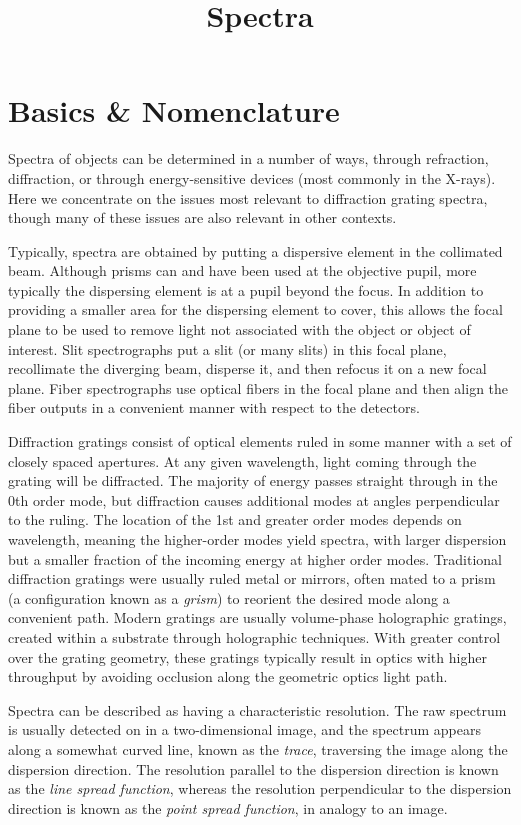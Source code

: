 \title{\bf Spectra}

\section{Basics \& Nomenclature}

Spectra of objects can be determined in a number of ways, through
refraction, diffraction, or through energy-sensitive devices (most
commonly in the X-rays). Here we concentrate on the issues most
relevant to diffraction grating spectra, though many of these issues
are also relevant in other contexts.

Typically, spectra are obtained by putting a dispersive element in the
collimated beam. Although prisms can and have been used at the
objective pupil, more typically the dispersing element is at a pupil
beyond the focus. In addition to providing a smaller area for the
dispersing element to cover, this allows the focal plane to be used to
remove light not associated with the object or object of
interest. Slit spectrographs put a slit (or many slits) in this focal
plane, recollimate the diverging beam, disperse it, and then refocus
it on a new focal plane. Fiber spectrographs use optical fibers in the
focal plane and then align the fiber outputs in a convenient manner
with respect to the detectors.

Diffraction gratings consist of optical elements ruled in some manner
with a set of closely spaced apertures. At any given wavelength, light
coming through the grating will be diffracted. The majority of energy
passes straight through in the 0th order mode, but diffraction causes
additional modes at angles perpendicular to the ruling. The location
of the 1st and greater order modes depends on wavelength, meaning the
higher-order modes yield spectra, with larger dispersion but a smaller
fraction of the incoming energy at higher order modes. Traditional
diffraction gratings were usually ruled metal or mirrors, often mated
to a prism (a configuration known as a {\it grism}) to reorient the
desired mode along a convenient path. Modern gratings are usually
volume-phase holographic gratings, created within a substrate through
holographic techniques. With greater control over the grating
geometry, these gratings typically result in optics with higher
throughput by avoiding occlusion along the geometric optics light
path.

Spectra can be described as having a characteristic resolution. The
raw spectrum is usually detected on in a two-dimensional image, and
the spectrum appears along a somewhat curved line, known as the {\it
trace}, traversing the image along the dispersion direction. The
resolution parallel to the dispersion direction is known as the {\it
line spread function}, whereas the resolution perpendicular to the
dispersion direction is known as the {\it point spread function}, in
analogy to an image.

